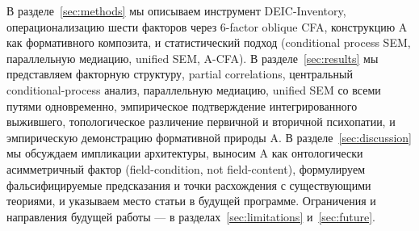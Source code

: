 В разделе~\ref{sec:methods} мы описываем инструмент DEIC-Inventory, операционализацию шести факторов через 6-factor oblique CFA, конструкцию A как формативного композита, и статистический подход (conditional process SEM, параллельную медиацию, unified SEM, A-CFA). В разделе~\ref{sec:results} мы представляем факторную структуру, partial correlations, центральный conditional-process анализ, параллельную медиацию, unified SEM со всеми путями одновременно, эмпирическое подтверждение интегрированного выжившего, топологическое различение первичной и вторичной психопатии, и эмпирическую демонстрацию формативной природы A. В разделе~\ref{sec:discussion} мы обсуждаем импликации архитектуры, выносим A как онтологически асимметричный фактор (field-condition, not field-content), формулируем фальсифицируемые предсказания и точки расхождения с существующими теориями, и указываем место статьи в будущей программе. Ограничения и направления будущей работы --- в разделах~\ref{sec:limitations} и~\ref{sec:future}.
